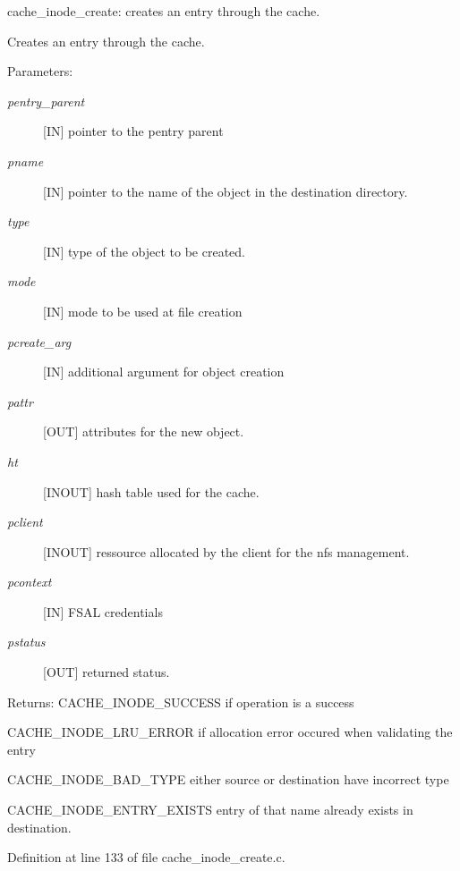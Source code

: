 cache\_\-inode\_\-create: creates an entry through the cache.

Creates an entry through the cache.

\begin{Desc}
\item[Parameters:]
\begin{description}
\item[{\em pentry\_\-parent}][IN] pointer to the pentry parent \item[{\em pname}][IN] pointer to the name of the object in the destination directory. \item[{\em type}][IN] type of the object to be created. \item[{\em mode}][IN] mode to be used at file creation \item[{\em pcreate\_\-arg}][IN] additional argument for object creation \item[{\em pattr}][OUT] attributes for the new object. \item[{\em ht}][INOUT] hash table used for the cache. \item[{\em pclient}][INOUT] ressource allocated by the client for the nfs management. \item[{\em pcontext}][IN] FSAL credentials \item[{\em pstatus}][OUT] returned status.\end{description}
\end{Desc}
\begin{Desc}
\item[Returns:]CACHE\_\-INODE\_\-SUCCESS if operation is a success \par
 

CACHE\_\-INODE\_\-LRU\_\-ERROR if allocation error occured when validating the entry\par
 

CACHE\_\-INODE\_\-BAD\_\-TYPE either source or destination have incorrect type\par
 

CACHE\_\-INODE\_\-ENTRY\_\-EXISTS entry of that name already exists in destination. \end{Desc}


Definition at line 133 of file cache\_\-inode\_\-create.c.
